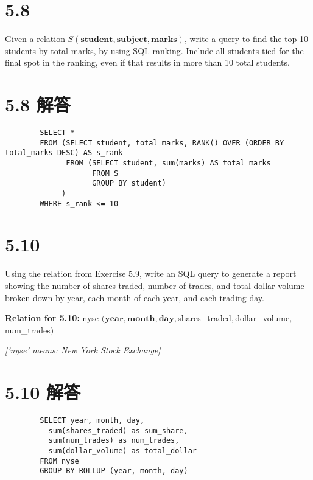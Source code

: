 \documentclass{article}
\begin{document}
	\section*{5.8}
	
	Given a relation $ S(\textbf{student}, \textbf{subject}, \textbf{marks}) $, write a query to find the top 10 students by total marks, by using SQL ranking. Include all students tied for the final spot in the ranking, even if that results in more than 10 total students.
	
	\section*{5.8 解答}
	
	\begin{verbatim}
		SELECT *
		FROM (SELECT student, total_marks, RANK() OVER (ORDER BY total_marks DESC) AS s_rank
		      FROM (SELECT student, sum(marks) AS total_marks
		            FROM S
		            GROUP BY student)
		     )
		WHERE s_rank <= 10
	\end{verbatim}
	
	\section*{5.10}
	
    Using the relation from Exercise 5.9, write an SQL query to generate a report showing the number of shares traded, number of trades, and total dollar volume broken down by year, each month of each year, and each trading day.
    
    \textbf{Relation for 5.10:}
    $
    $nyse $ (\textbf{year}, \textbf{month}, \textbf{day}, $shares\_traded$, $dollar\_volume$, $num\_trades$)
    $
    
    \textit{['nyse' means: New York Stock Exchange]}
	
	\section*{5.10 解答}
	
	\begin{verbatim}
		SELECT year, month, day, 
		  sum(shares_traded) as sum_share, 
		  sum(num_trades) as num_trades, 
		  sum(dollar_volume) as total_dollar
		FROM nyse
		GROUP BY ROLLUP (year, month, day)
	\end{verbatim}
\end{document}
